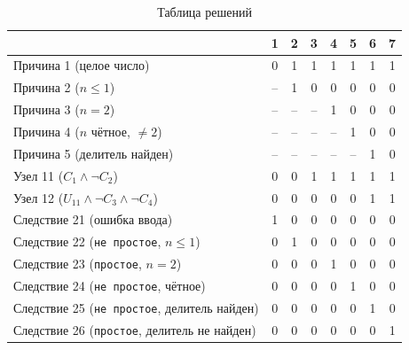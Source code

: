 \documentclass{article}[14pt]
\begin{document}
\begin{table}[H]
\centering
\caption{Таблица решений}
\renewcommand{\arraystretch}{1.4}
\begin{tabular}{|l|c|c|c|c|c|c|c|}
\hline
 & \textbf{1} & \textbf{2} & \textbf{3} & \textbf{4} & \textbf{5} & \textbf{6} & \textbf{7} \\
\hline
Причина 1 (целое число)        & 0 & 1 & 1 & 1 & 1 & 1 & 1 \\
\hline
Причина 2 ($n \leq 1$)         & -- & 1 & 0 & 0 & 0 & 0 & 0 \\
\hline
Причина 3 ($n = 2$)            & -- & -- & -- & 1 & 0 & 0 & 0 \\
\hline
Причина 4 ($n$ чётное, $\neq2$) & -- & -- & -- & -- & 1 & 0 & 0 \\
\hline
Причина 5 (делитель найден)    & -- & -- & -- & -- & -- & 1 & 0 \\
\hline
Узел 11 ($C_1 \wedge \neg C_2$)             & 0 & 0 & 1 & 1 & 1 & 1 & 1 \\
\hline
Узел 12 ($U_{11} \wedge \neg C_3 \wedge \neg C_4$) & 0 & 0 & 0 & 0 & 0 & 1 & 1 \\
\hline
Следствие 21 (ошибка ввода)    & 1 & 0 & 0 & 0 & 0 & 0 & 0 \\
\hline
Следствие 22 (\texttt{не простое}, $n\leq1$) & 0 & 1 & 0 & 0 & 0 & 0 & 0 \\
\hline
Следствие 23 (\texttt{простое}, $n=2$)      & 0 & 0 & 0 & 1 & 0 & 0 & 0 \\
\hline
Следствие 24 (\texttt{не простое}, чётное)  & 0 & 0 & 0 & 0 & 1 & 0 & 0 \\
\hline
Следствие 25 (\texttt{не простое}, делитель найден) & 0 & 0 & 0 & 0 & 0 & 1 & 0 \\
\hline
Следствие 26 (\texttt{простое}, делитель не найден) & 0 & 0 & 0 & 0 & 0 & 0 & 1 \\
\hline
\end{tabular}
\end{table}
\end{document}
